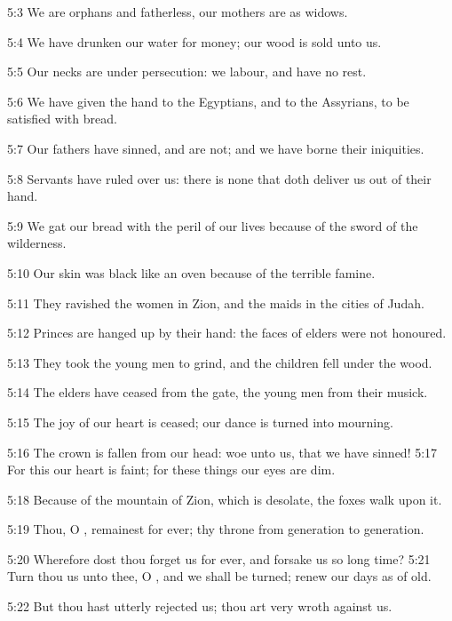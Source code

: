 5:3 We are orphans and fatherless, our mothers are as widows.

5:4 We have drunken our water for money; our wood is sold unto us.

5:5 Our necks are under persecution: we labour, and have no rest.

5:6 We have given the hand to the Egyptians, and to the Assyrians, to be satisfied with bread.

5:7 Our fathers have sinned, and are not; and we have borne their iniquities.

5:8 Servants have ruled over us: there is none that doth deliver us out of their hand.

5:9 We gat our bread with the peril of our lives because of the sword of the wilderness.

5:10 Our skin was black like an oven because of the terrible famine.

5:11 They ravished the women in Zion, and the maids in the cities of Judah.

5:12 Princes are hanged up by their hand: the faces of elders were not honoured.

5:13 They took the young men to grind, and the children fell under the wood.

5:14 The elders have ceased from the gate, the young men from their musick.

5:15 The joy of our heart is ceased; our dance is turned into mourning.

5:16 The crown is fallen from our head: woe unto us, that we have sinned!  5:17 For this our heart is faint; for these things our eyes are dim.

5:18 Because of the mountain of Zion, which is desolate, the foxes walk upon it.

5:19 Thou, O \LORD, remainest for ever; thy throne from generation to generation.

5:20 Wherefore dost thou forget us for ever, and forsake us so long time?  5:21 Turn thou us unto thee, O \LORD, and we shall be turned; renew our days as of old.

5:22 But thou hast utterly rejected us; thou art very wroth against us.


